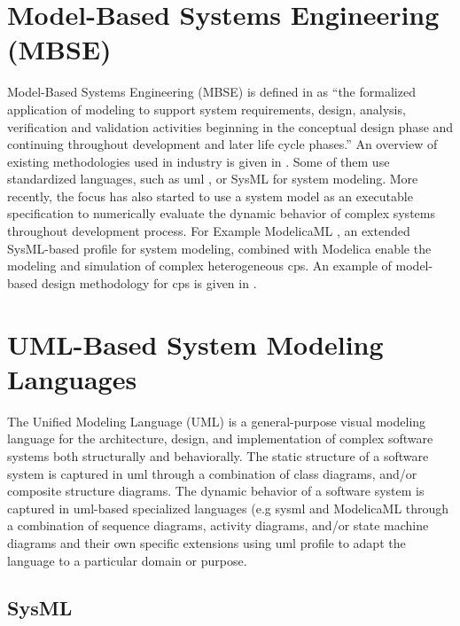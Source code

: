 \section{Model-Based Systems Engineering (MBSE)}
\label{sec:mbse}

Model-Based Systems Engineering (MBSE) is defined in \cite{mbsdincose} as “the formalized application of modeling to support system requirements, design, analysis, verification and validation activities beginning in the conceptual design phase and continuing throughout development and later life cycle phases.” An overview of existing methodologies used in industry is given in \cite{mbsdestefan}. Some of them use standardized languages, such as \acrshort{uml} \cite{uml}, or SysML \cite{sysml} for system modeling. 
More recently, the focus has also started to use a system model as an executable specification to numerically evaluate the dynamic behavior of complex systems throughout development process. For Example ModelicaML \cite{modelicaml, modelicamlreport}, an extended SysML-based profile for system modeling, combined with Modelica enable the modeling and simulation of complex heterogeneous \acrshort{cps}. An example of model-based design methodology for \acrshort{cps} is given in \cite{mbsdjensen}.


\section{UML-Based System Modeling Languages}
\label{sec:uml}
   
The Unified Modeling Language (UML) \cite{uml} is a general-purpose visual modeling language for the architecture, design, and implementation of complex software systems both structurally and behaviorally. The static structure of a software system is captured in \acrshort{uml} through a combination of class diagrams, and/or composite structure diagrams. The dynamic behavior of a software system is captured in \acrshort{uml}-based specialized languages (e.g \acrshort{sysml}\cite{sysml,sysmlmorgan} and ModelicaML\cite{modelicaml, modelicamlreport} through a combination of sequence diagrams, activity diagrams, and/or state machine diagrams and their own specific extensions using \acrshort{uml} profile to adapt the language to a particular domain or purpose. 

\subsection{SysML}
\label{sec:sysml}



